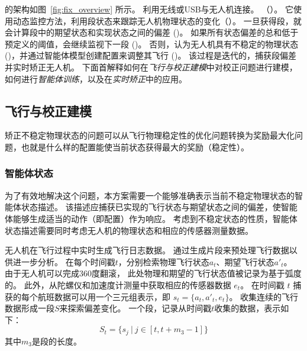 \nyctea 的架构如图~\ref{fig:fix_overview} 所示。
\nyctea 利用无线或USB与无人机连接。 （）。
它使用动态监控方法，利用段状态来跟踪无人机物理状态的变化（）。
一旦获得段，\nyctea 就会计算段中的期望状态和实现状态之间的偏差 ()。
如果所有状态偏差的总和低于预定义的阈值，\nyctea 会继续监视下一段 ()。
否则，\nyctea 认为无人机具有不稳定的物理状态 ()，并通过智能体模型创建配置来调整其飞行 ()。
该过程是迭代的，\nyctea 捕获段偏差并实时矫正无人机。
下面首解释如何在\emph{飞行与校正建模}中对校正问题进行建模，如何进行\emph{智能体训练}，以及在\emph{实时矫正}中的应用。


\subsection{飞行与校正建模}
矫正不稳定物理状态的问题可以从飞行物理稳定性的优化问题转换为奖励最大化问题，也就是什么样的配置能使当前状态获得最大的奖励（稳定性）。

\subsubsection{智能体状态}
为了有效地解决这个问题，本方案需要一个能够准确表示当前不稳定物理状态的智能体状态描述。 
该描述应捕获已实现的飞行状态与期望状态之间的偏差，使智能体能够生成适当的动作（即配置）作为响应。
考虑到不稳定状态的性质，智能体状态描述需要同时考虑无人机的物理状态和相应的传感器测量数据。

无人机在飞行过程中实时生成飞行日志数据。
\nyctea 通过生成片段来预处理飞行数据以供进一步分析。
在每个时间戳$t$，\nyctea 分别检索物理飞行状态$a_t$、期望飞行状态$a'_t$。
由于无人机可以完成360度翻滚， 此处物理和期望的飞行状态值被记录为基于弧度的。
此外，\nyctea 从陀螺仪和加速度计测量中获取相应的传感器数据 $e_t$。
在时间戳 $t$ 捕获的每个航班数据可以用一个三元组表示，即 $s_t = \{a_t, a'_t, e_t\}$。
\nyctea 收集连续的飞行数据形成一段$S$来探索偏差变化。
一个段，记录从时间戳$t$收集的数据，表示如下：
\begin{equation}
    S_t = \{s_j~|~j \in [t, t+m_{3}-1]\}
\end{equation}
其中$m_{3}$是段的长度。

